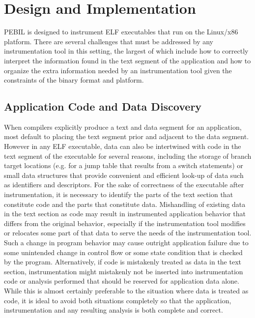 \section{Design and Implementation}
\label{sec:Overview}

PEBIL is designed to instrument ELF executables that run on the Linux/x86 platform.
There are several challenges that must be
addressed by any instrumentation tool in this setting, the largest of which include how to correctly
interpret the information found in the text segment of the application and how to organize the
extra information needed by an instrumentation tool given the constraints of the binary format
and platform.

\subsection{Application Code and Data Discovery}
When compilers explicitly produce a text and data segment for an application,
most default to placing the text segment prior and adjacent to the data segment.
However in any ELF executable, data can also be intertwined with code in the text segment of the executable for several reasons, including
the storage of branch target locations (e.g. for a jump table that results from a switch statements) or small data structures 
that provide convenient and efficient look-up of data such as identifiers and descriptors. 
For the sake of correctness of the executable after instrumentation, it is necessary to identify the parts of the text 
section that constitute code and the parts that constitute data. Mishandling of existing data in the text section as code 
may result in instrumented application behavior that differs from the original behavior, especially 
if the instrumentation tool modifies or relocates some part of that data 
to serve the needs of the instrumentation tool. 
Such a change in program behavior may cause outright application failure due to some unintended change in control flow 
or some state condition that is checked by the program.
Alternatively, if code is mistakenly treated as data in the text section, instrumentation might
mistakenly not be inserted into instrumentation code or analysis performed that should be reserved for
application data alone. While this is almost certainly preferable to the situation where data is treated as code, it
is ideal to avoid both situations completely so that the application, 
instrumentation and any resulting analysis is both complete and correct.

